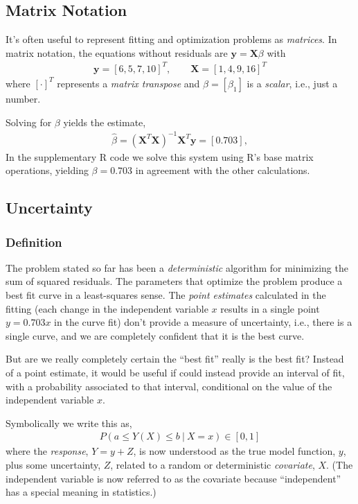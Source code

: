 \subsection{Matrix Notation}

It's often useful to represent fitting and optimization problems as \emph{matrices}. 
In matrix notation, 
the equations without residuals are
\(\boldsymbol{y} = \boldsymbol{X}\beta\) with
\begin{align}
\boldsymbol{y} = [6,5,7,10]^{T},\qquad \boldsymbol{X}=[1,4,9,16]^{T}
\end{align}
where \([\cdot]^{T}\) represents a \emph{matrix transpose} 
and \(\beta = [\beta_{1}]\) is a \emph{scalar}, i.e., just a number.

Solving for \(\beta\) yields the estimate,
\begin{align}
\widehat{\beta} = 
\left( \boldsymbol{X}^{T}\boldsymbol{X} \right)^{- 1}\boldsymbol{X}^{T}\boldsymbol{y} = [ 0.703],
\end{align}
In the supplementary R code we solve this system using R's base matrix operations,
yielding \(\beta = 0.703\) in agreement with the other calculations.

\subsection{Uncertainty}

\subsubsection{Definition}

The problem stated so far has been a \emph{deterministic} algorithm for
minimizing the sum of squared residuals. 
The parameters that optimize
the problem produce a best fit curve in a least-squares sense. 
The \emph{point estimates} calculated in the fitting 
(each change in the independent variable \(x\) results in a single point \(y = 0.703x\) in
the curve fit) don't provide a measure of uncertainty, i.e., there is a
single curve, and we are completely confident that it is the best curve.

But are we really completely certain the ``best fit'' really is the best fit? 
Instead of a point estimate, 
it would be useful if could instead provide an interval of fit, 
with a probability associated to that interval, 
conditional on the value of the independent variable \(x\).

Symbolically we write this as,
\begin{align}
P\left( a \leq Y(X) \leq b\ |\ X = x\right) \in [0,1]
\end{align}
where the \emph{response}, \(Y=y+Z\), is now understood as the true
model function, \(y\), plus some uncertainty, \(Z\), 
related to a random or deterministic \emph{covariate}, \(X\). 
(The independent variable is now referred to as the covariate 
because ``independent'' has a special meaning in statistics.)

